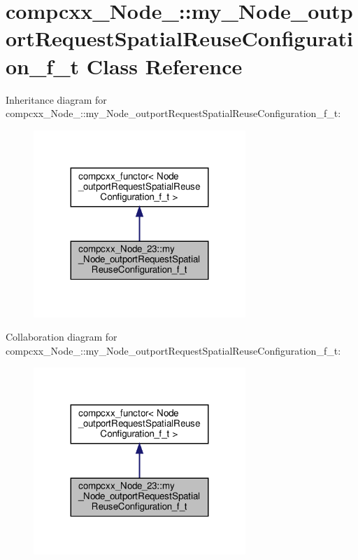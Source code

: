 \hypertarget{classcompcxx__Node__23_1_1my__Node__outportRequestSpatialReuseConfiguration__f__t}{}\section{compcxx\+\_\+\+Node\+\_\+:\+:my\+\_\+\+Node\+\_\+outport\+Request\+Spatial\+Reuse\+Configuration\+\_\+f\+\_\+t Class Reference}
\label{classcompcxx__Node__23_1_1my__Node__outportRequestSpatialReuseConfiguration__f__t}


Inheritance diagram for compcxx\+\_\+\+Node\+\_\+:\+:my\+\_\+\+Node\+\_\+outport\+Request\+Spatial\+Reuse\+Configuration\+\_\+f\+\_\+t\+:\nopagebreak
\begin{figure}[H]
\begin{center}
\leavevmode
\includegraphics[width=227pt]{classcompcxx__Node__23_1_1my__Node__outportRequestSpatialReuseConfiguration__f__t__inherit__graph}
\end{center}
\end{figure}


Collaboration diagram for compcxx\+\_\+\+Node\+\_\+:\+:my\+\_\+\+Node\+\_\+outport\+Request\+Spatial\+Reuse\+Configuration\+\_\+f\+\_\+t\+:\nopagebreak
\begin{figure}[H]
\begin{center}
\leavevmode
\includegraphics[width=227pt]{classcompcxx__Node__23_1_1my__Node__outportRequestSpatialReuseConfiguration__f__t__coll__graph}
\end{center}
\end{figure}
